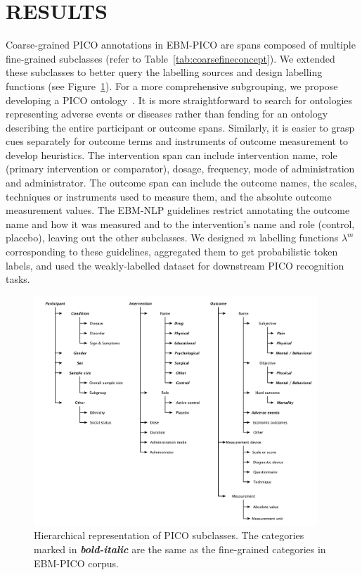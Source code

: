 \documentclass[10.7pt,]{article}
\begin{document}
\section{RESULTS}\label{results}
%
Coarse-grained PICO annotations in EBM-PICO are spans composed of multiple fine-grained subclasses (refer to Table~\ref{tab:coarsefineconcept}).
We extended these subclasses to better query the labelling sources and design labelling functions (see Figure~\ref{fig:target_subgroups}).
For a more comprehensive subgrouping, we propose developing a PICO ontology~\cite{sanchez2022annotated}.
It is more straightforward to search for ontologies representing adverse events or diseases rather than fending for an ontology describing the entire participant or outcome spans.
Similarly, it is easier to grasp cues separately for outcome terms and instruments of outcome measurement to develop heuristics.
The intervention span can include intervention name, role (primary intervention or comparator), dosage, frequency, mode of administration and administrator.
The outcome span can include the outcome names, the scales, techniques or instruments used to measure them, and the absolute outcome measurement values.
The EBM-NLP guidelines restrict annotating the outcome name and how it was measured and to the intervention's name and role (control, placebo), leaving out the other subclasses.
We designed $m$ labelling functions $\lambda^{m}$ corresponding to these guidelines, aggregated them to get probabilistic token labels, and used the weakly-labelled dataset for downstream PICO recognition tasks.
%
\begin{figure}[ht]
\centering
\includegraphics[width=0.95\textwidth]{figures/target_subgroups_.pdf}
\caption{\label{fig:target_subgroups} Hierarchical representation of PICO subclasses. The categories marked in \textbf{\textit{bold-italic}} are the same as the fine-grained categories in EBM-PICO corpus.}
\end{figure}
\end{document}
